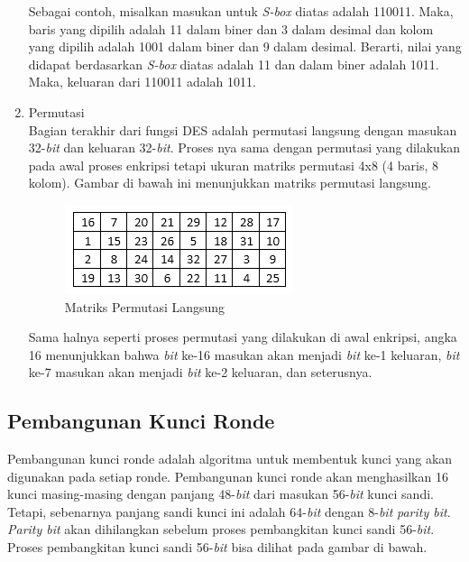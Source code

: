 \begin{enumerate}
	Sebagai contoh, misalkan masukan untuk \textit{S-box} diatas adalah 110011. Maka, baris yang dipilih adalah 11 dalam biner dan 3 dalam desimal dan kolom yang dipilih adalah 1001 dalam biner dan 9 dalam desimal. Berarti, nilai yang didapat berdasarkan \textit{S-box} diatas adalah 11 dan dalam biner adalah 1011. Maka, keluaran dari 110011 adalah 1011.

	\item Permutasi\\
Bagian terakhir dari fungsi DES adalah permutasi langsung dengan masukan 32-\textit{bit} dan keluaran 32-\textit{bit}. Proses nya sama dengan permutasi yang dilakukan pada awal proses enkripsi tetapi ukuran matriks permutasi 4x8 (4 baris, 8 kolom). Gambar di bawah ini menunjukkan matriks permutasi langsung.

\begin{figure}[ht]
	\includegraphics[scale=0.8]{Gambar/straight_permutation}
	\centering
	\caption{Matriks Permutasi Langsung}\label{fig:permutasi_langsung}
\end{figure}

Sama halnya seperti proses permutasi yang dilakukan di awal enkripsi, angka 16 menunjukkan bahwa \textit{bit} ke-16 masukan akan menjadi \textit{bit} ke-1 keluaran, \textit{bit} ke-7 masukan akan menjadi \textit{bit} ke-2 keluaran, dan seterusnya.
\end{enumerate}

\subsection{Pembangunan Kunci Ronde}
Pembangunan kunci ronde adalah algoritma untuk membentuk kunci yang akan digunakan pada setiap ronde. Pembangunan kunci ronde akan menghasilkan 16 kunci masing-masing dengan panjang 48-\textit{bit} dari masukan 56-\textit{bit} kunci sandi. Tetapi, sebenarnya panjang sandi kunci ini adalah 64-\textit{bit} dengan 8-\textit{bit} \textit{parity bit}. \textit{Parity bit} akan dihilangkan sebelum proses pembangkitan kunci sandi 56-\textit{bit}. Proses pembangkitan kunci sandi 56-\textit{bit} bisa dilihat pada gambar di bawah.

